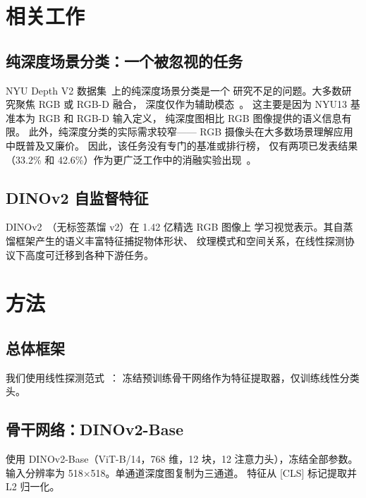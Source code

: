 \documentclass[conference, a4paper]{IEEEtran}
\begin{document}
\section{相关工作}

\subsection{纯深度场景分类：一个被忽视的任务}

NYU Depth V2 数据集~\cite{nyu_depth}上的纯深度场景分类是一个
研究不足的问题。大多数研究聚焦 RGB 或 RGB-D 融合，
深度仅作为辅助模态~\cite{gupta2014indoor}。
这主要是因为 NYU13 基准本为 RGB 和 RGB-D 输入定义，
纯深度图相比 RGB 图像提供的语义信息有限。
此外，纯深度分类的实际需求较窄——
RGB 摄像头在大多数场景理解应用中既普及又廉价。
因此，该任务没有专门的基准或排行榜，
仅有两项已发表结果（33.2\% 和 42.6\%）作为更广泛工作中的消融实验出现~\cite{wang3d, hoffman2016}。

\subsection{DINOv2 自监督特征}

DINOv2~\cite{dinov2}（无标签蒸馏 v2）在 1.42 亿精选 RGB 图像上
学习视觉表示。其自蒸馏框架产生的语义丰富特征捕捉物体形状、
纹理模式和空间关系，在线性探测协议下高度可迁移到各种下游任务。

\section{方法}

\subsection{总体框架}

我们使用线性探测范式~\cite{alain2016understanding}：
冻结预训练骨干网络作为特征提取器，仅训练线性分类头。

\subsection{骨干网络：DINOv2-Base}

使用 DINOv2-Base（ViT-B/14，768 维，12 块，12 注意力头），冻结全部参数。
输入分辨率为 518$\times$518。单通道深度图复制为三通道。
特征从 [CLS] 标记提取并 L2 归一化。
\end{document}
